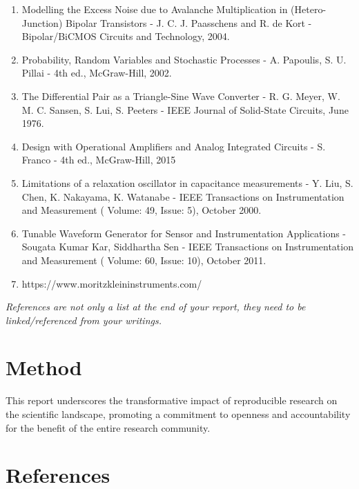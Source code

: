 \documentclass[
  11pt,
  a4paper,
  twoside]{scrbook}
\providecommand{\tightlist}{%
  \setlength{\itemsep}{0pt}\setlength{\parskip}{0pt}}
\begin{document}
\begin{enumerate}
\def\labelenumi{\arabic{enumi}.}
\tightlist
\item
  Modelling the Excess Noise due to Avalanche Multiplication in
  (Hetero-Junction) Bipolar Transistors - J. C. J. Paasschens and R. de
  Kort - Bipolar/BiCMOS Circuits and Technology, 2004.
\item
  Probability, Random Variables and Stochastic Processes - A. Papoulis,
  S. U. Pillai - 4th ed., McGraw-Hill, 2002.
\item
  The Differential Pair as a Triangle-Sine Wave Converter - R. G. Meyer,
  W. M. C. Sansen, S. Lui, S. Peeters - IEEE Journal of Solid-State
  Circuits, June 1976.
\item
  Design with Operational Amplifiers and Analog Integrated Circuits - S.
  Franco - 4th ed., McGraw-Hill, 2015
\item
  Limitations of a relaxation oscillator in capacitance measurements -
  Y. Liu, S. Chen, K. Nakayama, K. Watanabe - IEEE Transactions on
  Instrumentation and Measurement ( Volume: 49, Issue: 5), October 2000.
\item
  Tunable Waveform Generator for Sensor and Instrumentation Applications
  - Sougata Kumar Kar, Siddhartha Sen - IEEE Transactions on
  Instrumentation and Measurement ( Volume: 60, Issue: 10), October
  2011.
\item
  https://www.moritzkleininstruments.com/
\end{enumerate}

\emph{References are not only a list at the end of your report, they
need to be linked/referenced from your writings.}


\chapter{Method}\label{sec-method}

This report underscores the transformative impact of reproducible
research on the scientific landscape, promoting a commitment to openness
and accountability for the benefit of the entire research community.


\chapter*{References}\label{references-1}
\end{document}
